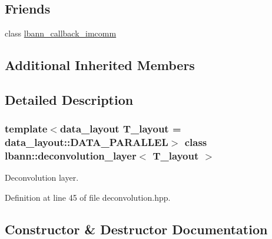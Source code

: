 \subsection*{Friends}
\begin{DoxyCompactItemize}
\item 
class \hyperlink{classlbann_1_1deconvolution__layer_a6d54673503b45aeb6526f041224900c6}{lbann\+\_\+callback\+\_\+imcomm}
\end{DoxyCompactItemize}
\subsection*{Additional Inherited Members}


\subsection{Detailed Description}
\subsubsection*{template$<$data\+\_\+layout T\+\_\+layout = data\+\_\+layout\+::\+D\+A\+T\+A\+\_\+\+P\+A\+R\+A\+L\+L\+EL$>$\newline
class lbann\+::deconvolution\+\_\+layer$<$ T\+\_\+layout $>$}

Deconvolution layer. 

Definition at line 45 of file deconvolution.\+hpp.



\subsection{Constructor \& Destructor Documentation}
\mbox{\label{classlbann_1_1deconvolution__layer_a95350e60a92634952c21b449ea14933d}} 
